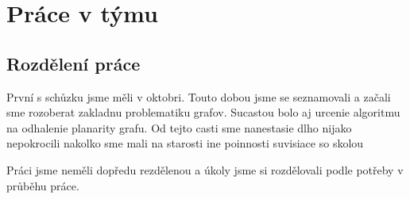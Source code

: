 \section{Práce v týmu}

\subsection{Rozdělení práce}
První s schůzku jsme měli v oktobri.
Touto dobou jsme se seznamovali a začali sme rozoberat zakladnu problematiku grafov. Sucastou bolo aj urcenie algoritmu
na odhalenie planarity grafu.
Od tejto casti sme nanestasie dlho nijako nepokrocili nakolko sme mali na starosti ine poinnosti suvisiace so skolou

Práci jsme neměli dopředu rezdělenou a úkoly jsme si rozdělovali podle potřeby v průběhu práce.


